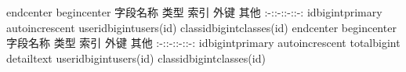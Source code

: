 {}\markdownRendererBackslash{}end\markdownRendererLeftBrace{}center\markdownRendererRightBrace{}\markdownRendererInterblockSeparator
{}\markdownRendererInterblockSeparator
{}\markdownRendererBackslash{}begin\markdownRendererLeftBrace{}center\markdownRendererRightBrace{}\markdownRendererInterblockSeparator
{}\markdownRendererPipe{} 字段名称 \markdownRendererPipe{} 类型 \markdownRendererPipe{} 索引 \markdownRendererPipe{} 外键 \markdownRendererPipe{} 其他 \markdownRendererPipe{} \markdownRendererPipe{}:-:\markdownRendererPipe{}:-:\markdownRendererPipe{}:-:\markdownRendererPipe{}:-:\markdownRendererPipe{} \markdownRendererPipe{}id\markdownRendererPipe{}bigint\markdownRendererPipe{}primary\markdownRendererPipe{}\markdownRendererPipe{} auto\markdownRendererBackslash{}\markdownRendererUnderscore{}increscent\markdownRendererPipe{} \markdownRendererPipe{}user\markdownRendererBackslash{}\markdownRendererUnderscore{}id\markdownRendererPipe{}bigint\markdownRendererPipe{}\markdownRendererPipe{}users(id)\markdownRendererPipe{}\markdownRendererPipe{} \markdownRendererPipe{}class\markdownRendererBackslash{}\markdownRendererUnderscore{}id\markdownRendererPipe{}bigint\markdownRendererPipe{}\markdownRendererPipe{}classes(id)\markdownRendererPipe{}\markdownRendererPipe{}\markdownRendererInterblockSeparator
{}\markdownRendererBackslash{}end\markdownRendererLeftBrace{}center\markdownRendererRightBrace{}\markdownRendererInterblockSeparator
{}\markdownRendererInterblockSeparator
{}\markdownRendererBackslash{}begin\markdownRendererLeftBrace{}center\markdownRendererRightBrace{}\markdownRendererInterblockSeparator
{}\markdownRendererPipe{} 字段名称 \markdownRendererPipe{} 类型 \markdownRendererPipe{} 索引 \markdownRendererPipe{} 外键 \markdownRendererPipe{} 其他 \markdownRendererPipe{} \markdownRendererPipe{}:-:\markdownRendererPipe{}:-:\markdownRendererPipe{}:-:\markdownRendererPipe{}:-:\markdownRendererPipe{} \markdownRendererPipe{}id\markdownRendererPipe{}bigint\markdownRendererPipe{}primary\markdownRendererPipe{}\markdownRendererPipe{} auto\markdownRendererBackslash{}\markdownRendererUnderscore{}increscent\markdownRendererPipe{} \markdownRendererPipe{}total\markdownRendererPipe{}bigint\markdownRendererPipe{}\markdownRendererPipe{}\markdownRendererPipe{}\markdownRendererPipe{} \markdownRendererPipe{}detail\markdownRendererPipe{}text\markdownRendererPipe{}\markdownRendererPipe{}\markdownRendererPipe{}\markdownRendererPipe{} \markdownRendererPipe{}user\markdownRendererBackslash{}\markdownRendererUnderscore{}id\markdownRendererPipe{}bigint\markdownRendererPipe{}\markdownRendererPipe{}users(id)\markdownRendererPipe{}\markdownRendererPipe{} \markdownRendererPipe{}class\markdownRendererBackslash{}\markdownRendererUnderscore{}id\markdownRendererPipe{}bigint\markdownRendererPipe{}\markdownRendererPipe{}classes(id)\markdownRendererPipe{}\markdownRendererPipe{}\markdownRendererInterblockSeparator
